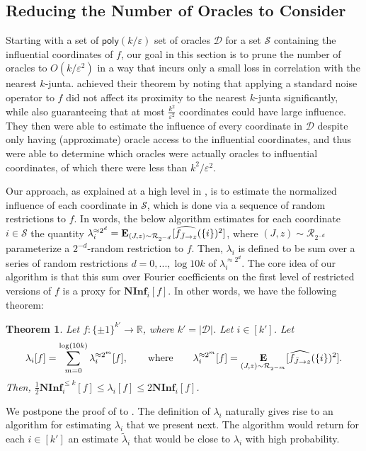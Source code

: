 \documentclass[10pt,a4paper]{article}
\providecommand{\poly}{\mathsf{poly}}
\theoremstyle{plain}
\newtheorem{theorem}{Theorem}[section]
\theoremstyle{remark}
\theoremstyle{plain}
\providecommand{\R}{}
\renewcommand{\R}{\mathbb{R}}
\providecommand{\E}{}
\renewcommand{\E}{\mathop{\bf E\/}}
\newcommand\NormInf{{\mathbf{NInf}}}
\newcommand{\eps}{\varepsilon}
\renewcommand{\hat}{\widehat}
\renewcommand{\tilde}{\widetilde}
\newcommand{\pmone}{\{\pm 1\}}
\newcommand{\calR}{\mathcal{R}}
\newcommand{\calS}{\mathcal{S}}
\newcommand{\InfluentialCoords}{\calS}
\newcommand{\InfluentialOracles}{\mathcal{D}}
\newcommand{\Restrictedf}{f_{\bar{J}\to z}}
\renewcommand{\epsilon}{\varepsilon}
\begin{document}
\subsection{Reducing the Number of Oracles to Consider}

Starting with a set of $\poly(k/\eps)$ set of oracles $\InfluentialOracles$ for a set $\InfluentialCoords$ containing the influential coordinates of $f$,
our goal in this section is to prune the number of oracles to $O(k/\eps^2)$ in a way that incurs only a small loss in correlation with the nearest $k$-junta. 
\cite{junta-coordinate-oracles} achieved their theorem by noting that applying a standard noise operator to $f$ did not affect its proximity to the nearest $k$-junta significantly, while also guaranteeing that at most $\frac{k^2}{\epsilon^2}$ coordinates could have large influence. They then were able to estimate the influence of every coordinate in $\InfluentialOracles$ despite only having (approximate) oracle access to the influential coordinates, and thus were able to determine which oracles were actually oracles to influential coordinates, of which there were less than $k^2/\epsilon^2$.

Our approach, as explained at a high level in , is to estimate the normalized influence of each coordinate in $\InfluentialCoords$, which is done via a sequence of random restrictions to $f$.
In words, the below algorithm estimates for each coordinate $i \in \InfluentialCoords$ the quantity $\lambda_i^{\approx 2^d} =\E_{(J,z)\sim \calR_{2^{-d}}}[ \hat{\Restrictedf}(\{i\})^2]$,
where $(J,z) \sim \calR_{2^{-d}}$ parameterize a $2^{-d}$-random restriction to $f$. Then, $\lambda_i$ is defined to be sum over a series of random restrictions $d=0,...,\log 10k$ of $\lambda_i^{\approx 2^d}$. The core idea of our algorithm is that this sum over Fourier coefficients on the first level of restricted versions of $f$ is a proxy for $\NormInf_i[f]$. In other words, we have the following theorem:
\begin{theorem}
\label{theorem:ninf-ub-lb}
Let $f: \pmone^{{k'}} \to \R$, where ${k'} = |\InfluentialOracles|$.
Let $i \in [{k'}]$.
Let 
$$\lambda_i[f] = \sum_{m=0}^{\log(10k)} \lambda_i^{\approx 2^{m}}[f],
\qquad \text{where}\qquad 
\lambda_i^{\approx 2^{m}}[f] = 
 \E_{(J,z) \sim \calR_{2^{-m}}}[\hat{\Restrictedf}(\{i\})^2].$$
Then, $\frac{1}{2}\NormInf_i^{\leq k}[f] \le \lambda_i[f] \le 2 \NormInf_i[f]$.
\end{theorem}

We postpone the proof of  to .
The definition of $\lambda_i$ naturally gives rise to an algorithm for estimating $\lambda_i$ that we present next. The algorithm would return for each $i \in [{k'}]$ an estimate $\tilde{\lambda}_{i}$ that would be close to $\lambda_i$ with high probability. 
\end{document}
